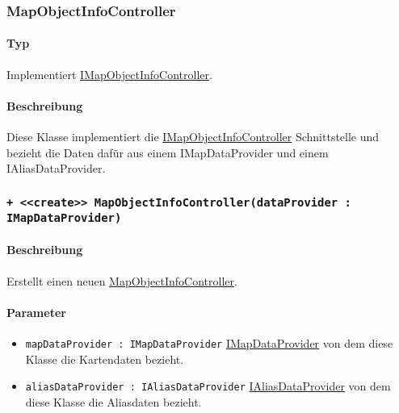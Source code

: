 \subsubsection{MapObjectInfoController}\label{App_Map_ViewModel_MapObjectInfoController}
\paragraph*{Typ}
Implementiert \hyperref[App_Map_ViewModel_IMapObjectInfoController]{IMapObjectInfoController}.
\paragraph*{Beschreibung}
Diese Klasse implementiert die \hyperref[App_Map_ViewModel_IMapObjectInfoController]{IMapObjectInfoController} Schnittstelle und bezieht die Daten 
dafür aus einem IMapDataProvider und einem IAliasDataProvider.

\subsubsection*{\texttt{+ <<create>> MapObjectInfoController(dataProvider : IMapDataProvider)}}\label{App_Map_ViewModel_createMapObjectInfoController}%
\paragraph*{Beschreibung}
Erstellt einen neuen \hyperref[App_Map_ViewModel_MapObjectInfoController]{MapObjectInfoController}.
\paragraph*{Parameter}
\begin{itemize}
    \item \texttt{mapDataProvider : IMapDataProvider} \hyperref[App_Map_Model_IMapDataProvider]{IMapDataProvider} von dem diese Klasse die Kartendaten bezieht.
    \item \texttt{aliasDataProvider : IAliasDataProvider} \hyperref[App_AddAlias_IAliasDataProvider]{IAliasDataProvider} von dem diese Klasse die Aliasdaten bezieht.
\end{itemize}
